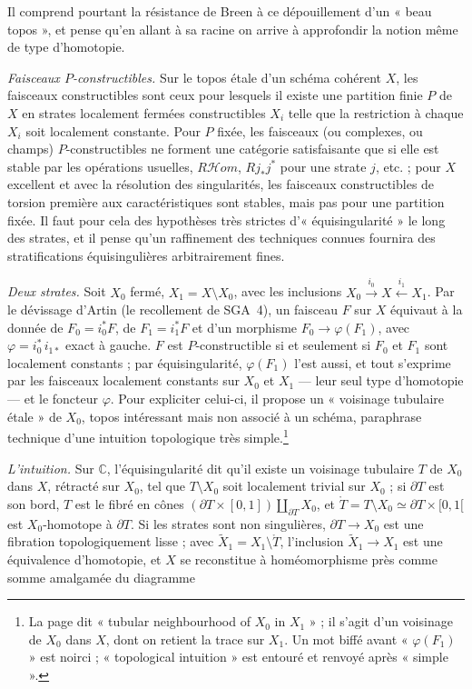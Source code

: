 \documentclass[11pt,a4paper]{article}
\begin{document}
Il comprend pourtant la résistance de Breen à ce dépouillement d'un « beau
topos », et pense qu'en allant à sa racine on arrive à approfondir la notion
même de type d'homotopie.

\emph{Faisceaux $P$-constructibles.} Sur le topos étale d'un schéma
cohérent $X$, les faisceaux constructibles sont ceux pour lesquels il existe
une partition finie $P$ de $X$ en strates localement fermées constructibles
$X_i$ telle que la restriction à chaque $X_i$ soit localement constante.
Pour $P$ fixée, les faisceaux (ou complexes, ou champs) $P$-constructibles
ne forment une catégorie satisfaisante que si elle est stable par les
opérations usuelles, $R\mathcal{H}om$, $Rj_*j^*$ pour une strate $j$, etc. ;
pour $X$ excellent et avec la résolution des singularités, les faisceaux
constructibles de torsion première aux caractéristiques sont stables, mais
pas pour une partition fixée. Il faut pour cela des hypothèses très strictes
d'« équisingularité » le long des strates, et il pense qu'un raffinement des
techniques connues fournira des stratifications équisingulières
arbitrairement fines.

\emph{Deux strates.} Soit $X_0$ fermé, $X_1 = X \setminus X_0$, avec les
inclusions $X_0 \xrightarrow{i_0} X \xleftarrow{i_1} X_1$. Par le dévissage
d'Artin (le recollement de SGA~4), un faisceau $F$ sur $X$ équivaut à la
donnée de $F_0 = i_0^*F$, de $F_1 = i_1^*F$ et d'un morphisme
$F_0 \to \varphi(F_1)$, avec $\varphi = i_0^*\,i_{1*}$ exact à gauche. $F$
est $P$-constructible si et seulement si $F_0$ et $F_1$ sont localement
constants ; par équisingularité, $\varphi(F_1)$ l'est aussi, et tout
s'exprime par les faisceaux localement constants sur $X_0$ et $X_1$ --- leur
seul type d'homotopie --- et le foncteur $\varphi$. Pour expliciter
celui-ci, il propose un « voisinage tubulaire étale » de $X_0$, topos
intéressant mais non associé à un schéma, paraphrase technique d'une intuition
topologique très simple.\footnote{La page dit « tubular neighbourhood of
$X_0$ in $X_1$ » ; il s'agit d'un voisinage de $X_0$ dans $X$, dont on
retient la trace sur $X_1$. Un mot biffé avant « $\varphi(F_1)$ » est
noirci ; « topological intuition » est entouré et renvoyé après « simple ».}

\emph{L'intuition.} Sur $\mathbb{C}$, l'équisingularité dit qu'il existe un
voisinage tubulaire $T$ de $X_0$ dans $X$, rétracté sur $X_0$, tel que
$T\setminus X_0$ soit localement trivial sur $X_0$ ; si $\partial T$ est son
bord, $T$ est le fibré en cônes
$(\partial T \times [0,1]) \amalg_{\partial T} X_0$, et
$\mathring T = T \setminus X_0 \simeq \partial T \times [0,1[$ est
$X_0$-homotope à $\partial T$. Si les strates sont non singulières,
$\partial T \to X_0$ est une fibration topologiquement lisse ; avec
$\widetilde X_1 = X_1 \setminus \mathring T$, l'inclusion
$\widetilde X_1 \to X_1$ est une équivalence d'homotopie, et $X$ se
reconstitue à homéomorphisme près comme somme amalgamée du diagramme
\end{document}
